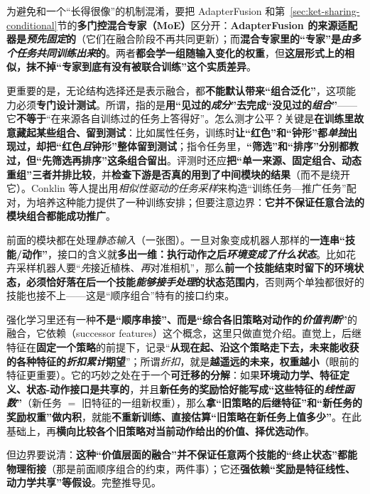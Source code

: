 为避免和一个“长得很像”的机制混淆，要把 AdapterFusion 和第~\ref{sec:ket-sharing-conditional}节的\textbf{多门控混合专家（MoE）}区分开：\textbf{AdapterFusion 的来源适配器是\emph{预先固定}的}（它们在融合阶段不再共同更新）；而\textbf{混合专家里的“专家”是\emph{由多个任务\emph{共同训练}出来}的}。两者\textbf{都会学一组随输入变化的权重}，但\textbf{这层形式上的相似，抹不掉“专家到底有没有被联合训练”这个实质差异}。

更重要的是，无论结构选择还是表示融合，都\textbf{不能默认带来“组合泛化”}，这项能力必须\textbf{专门设计测试}。所谓，指的是\textbf{用“见过的\emph{成分}”去完成“没见过的\emph{组合}”}——它\textbf{不等于}“在来源各自训练过的任务上答得好”。怎么测才公平？关键是\textbf{在训练里故意藏起某些组合、留到测试}：比如属性任务，训练时\textbf{让“红色”和“钟形”都\emph{单独}出现过，却把“红色\emph{且}钟形”整体留到测试}；指令任务里，\textbf{“筛选”和“排序”分别都教过，但“先筛选再排序”这条组合留出}。评测时还应\textbf{把“单一来源、固定组合、动态重组”三者并排比较}，并\textbf{检查下游是否真的用到了中间模块的结果}（而不是绕开它）。Conklin 等人提出用\emph{相似性驱动的任务采样}来构造“训练任务—推广任务”配对，为培养这种能力提供了一种训练安排；但要注意边界：\textbf{它并不保证任意合法的模块组合都能成功推广}。

前面的模块都在处理\emph{静态输入}（一张图）。一旦对象变成机器人那样的\textbf{一连串“技能/动作”}，接口的含义就\textbf{多出一维：执行动作之后\emph{环境变成了什么状态}}。比如花卉采样机器人要“\emph{先}接近植株、\emph{再}对准相机”，那么\textbf{前一个技能结束时留下的环境状态，必须恰好落在后一个技能\emph{能够接手处理}的状态范围内}，否则两个单独都很好的技能也接不上——这是“顺序组合”特有的接口约束。

强化学习里还有一种\textbf{不是“顺序串接”、而是“综合各旧策略对动作的\emph{价值判断}”}的融合，它依赖（successor features）这个概念，这里只做直觉介绍。直觉上，后继特征在\textbf{固定一个策略}的前提下，记录“\textbf{从现在起、沿这个策略走下去，未来能收获的各种特征的\emph{折扣累计}期望}”；所谓\emph{折扣}，就是\textbf{越遥远的未来，权重越小}（眼前的特征更重要）。它的巧妙之处在于一个\textbf{可迁移的分解}：如果\textbf{环境动力学、特征定义、状态-动作接口是共享的}，并且\textbf{新任务的奖励恰好能写成“这些特征的\emph{线性函数}”}（新任务 $=$ 旧特征的一组新权重），那么\textbf{拿“旧策略的后继特征”和“新任务的奖励权重”做内积}，就能\textbf{不重新训练、直接估算“旧策略在新任务上值多少”}。在此基础上，再\textbf{横向比较各个旧策略对当前动作给出的价值、择优选动作}。

但边界要说清：\textbf{这种“价值层面的融合”并不保证任意两个技能的“终止状态”都能物理衔接}（那是前面顺序组合的约束，两件事）；它还\textbf{强依赖“奖励是特征线性、动力学共享”等假设}。完整推导见。


